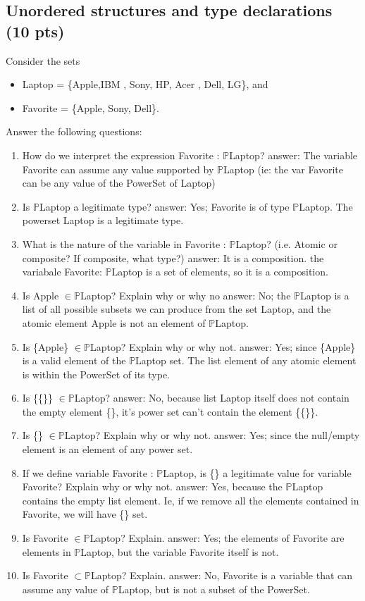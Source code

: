 \documentclass[12pt]{article}
\begin{document}
\subsection{Unordered structures and type declarations (10 pts)}
Consider the sets
\begin{itemize}
	\item Laptop = \{Apple,IBM , Sony, HP, Acer , Dell, LG\}, and
	\item Favorite = \{Apple, Sony, Dell\}.
\end{itemize}
Answer the following questions:
\begin{enumerate}
	\item How do we interpret the expression Favorite : $\mathbb{P}$Laptop?
	\subitem answer: 
	\subitem The variable Favorite can assume any value supported by $\mathbb{P}$Laptop (ie: the var Favorite can be any value of the PowerSet of Laptop)
	\item Is $\mathbb{P}$Laptop a legitimate type?
	\subitem answer: 
	\subitem Yes; Favorite is of type $\mathbb{P}$Laptop. The powerset Laptop is a legitimate type.
	\item What is the nature of the variable in Favorite : $\mathbb{P}$Laptop? (i.e. Atomic or composite? If composite, what type?)
	\subitem answer: 
	\subitem It is a composition. the variabale Favorite: $\mathbb{P}$Laptop is a set of elements, so it is a composition.
	\item Is Apple $\in \mathbb{P}$Laptop? Explain why or why no
	\subitem answer:
	\subitem No; the $\mathbb{P}$Laptop is a list of all possible subsets we can produce from the set Laptop, and the atomic element Apple is not an element of $\mathbb{P}$Laptop.
	\item Is \{Apple\} $\in \mathbb{P}$Laptop? Explain why or why not.
	\subitem answer:
	\subitem Yes; since \{Apple\} is a valid element of the $\mathbb{P}$Laptop set. The list element of any atomic element is within the PowerSet of its type.
	\item Is \{\{\}\} $\in \mathbb{P}$Laptop?
	\subitem answer:
	\subitem No, because list Laptop itself does not contain the empty element \{\}, it's power set can't contain the element \{\{\}\}.
	\item Is \{\} $\in \mathbb{P}$Laptop? Explain why or why not.
	\subitem answer:
	\subitem Yes; since the null/empty element is an element of any power set.
	\item If we define variable Favorite : $\mathbb{P}$Laptop, is \{\} a legitimate value for variable Favorite? Explain why or why not.
	\subitem answer:
	\subitem Yes, because the $\mathbb{P}$Laptop contains the empty list element. Ie, if we remove all the elements contained in Favorite, we will have \{\} set.
	\item Is Favorite $\in \mathbb{P}$Laptop? Explain.
	\subitem answer:
	\subitem Yes; the elements of Favorite are elements in $\mathbb{P}$Laptop, but the variable Favorite itself is not.
	\item Is Favorite $\subset \mathbb{P}$Laptop? Explain.
	\subitem answer:
	\subitem No, Favorite is a variable that can assume any value of $\mathbb{P}$Laptop, but is not a subset of the PowerSet.
\end{enumerate}
\newpage
\end{document}
